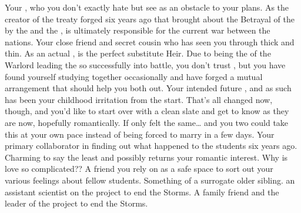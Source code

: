 \documentclass[char]{GL2020}
\begin{document}
\begin{contacts}
    \contact{\cDiplomat{}} Your \cDiplomat{\auncle}, who you don’t exactly hate but see as an obstacle to your plans. As the creator of the treaty forged six years ago that brought about the Betrayal of the \pShip{} by the \pTech{} and the \pFarm{}, \cDiplomat{} is ultimately responsible for the current war between the nations.
    \contact{\cAmbition{}} Your close friend and secret cousin who has seen you through thick and thin. As an actual \cHeir{\formal}, \cAmbition{} is the perfect substitute Heir.
    \contact{\cWarlordDaughter{}} Due to \cWarlordDaughter{} being the \cWarlordDaughter{\offspring} of the Warlord leading the \pShippies{} so successfully into battle, you don’t trust \cWarlordDaughter{\them}, but you have found yourself studying together occasionally and have forged a mutual arrangement that should help you both out. 
    \contact{\cChupStudent{}} Your intended future \cChupStudent{\spouse}, and as such has been your childhood irritation from the start. That's all changed now, though, and you'd like to start over with a clean slate and get to know \cChupStudent{\them} as they are now, hopefully romantically. If only \cChupStudent{\they} felt the same\ldots{} and you two could take this at your own pace instead of being forced to marry in a few days.
    \contact{\cPresident{}} Your primary collaborator in finding out what happened to the students six years ago. Charming to say the least and possibly returns your romantic interest. Why is love so complicated??
    \contact{\cAssistantScientist{}} A friend you rely on as a safe space to sort out your various feelings about fellow students. Something of a surrogate older sibling. \cAssistantScientist{\Theyare} an assistant scientist on the project to end the Storms.
    \contact{\cHeadScientist{}} A family friend and the leader of the project to end the Storms.
\end{contacts}
\end{document}

